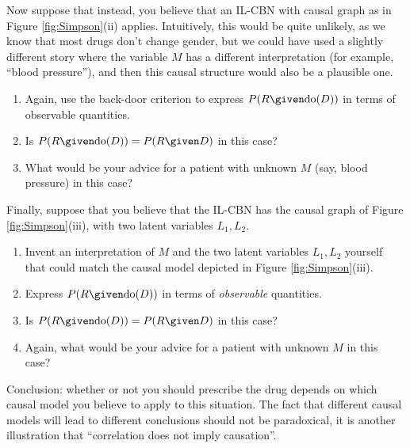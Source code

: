 \begin{enumerate}
Now suppose that instead, you believe that an IL-CBN with causal graph as in Figure \ref{fig:Simpson}(ii) applies. Intuitively, this would be quite unlikely, as we
know that most drugs don't change gender, but we could have used a slightly different story where the variable $M$ has a different interpretation
(for example, ``blood pressure''), and then this causal structure would also be a plausible one.

\begin{enumerate}[resume*]
  \item Again, use the back-door criterion to express $P(R \given \text{do}(D))$ in terms of observable quantities.
  \item Is $P(R \given \text{do}(D)) = P(R \given D)$ in this case?
  \item \label{Simpson_2} What would be your advice for a patient with unknown $M$ (say, blood pressure) in this case?
\end{enumerate}

Finally, suppose that you believe that the IL-CBN has the causal graph of Figure \ref{fig:Simpson}(iii), with two
latent variables $L_1,L_2$.

\begin{enumerate}[resume*]
  \item Invent an interpretation of $M$ and the two latent variables $L_1,L_2$ yourself that could match the causal model depicted in Figure \ref{fig:Simpson}(iii).
  \item Express $P(R \given \text{do}(D))$ in terms of \emph{observable} quantities.
  \item Is $P(R \given \text{do}(D)) = P(R \given D)$ in this case?
  \item Again, what would be your advice for a patient with unknown $M$ in this case?
\end{enumerate}

Conclusion: whether or not you should prescribe the drug depends on which causal model you believe to apply to this situation. 
The fact that different causal models will lead to different conclusions should not be paradoxical, it is another illustration that
``correlation does not imply causation''.


\end{enumerate}
